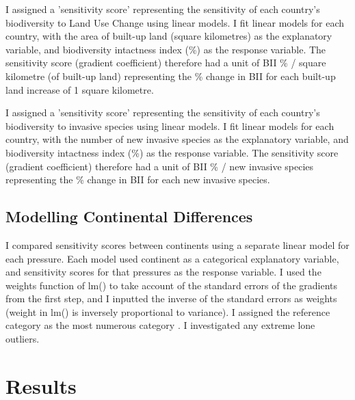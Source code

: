 \documentclass[11pt, a4paper, titlepage]{article}
\begin{document}
	I assigned a 'sensitivity score' representing the sensitivity of each country's biodiversity to Land Use Change using linear models. I fit linear models for each country, with the area of built-up land (square kilometres) as the explanatory variable, and biodiversity intactness index (\%) as the response variable. The sensitivity score (gradient coefficient) therefore had a unit of BII \% / square kilometre (of built-up land) representing the \% change in BII for each built-up land increase of 1 square kilometre.
	
	I assigned a 'sensitivity score' representing the sensitivity of each country's biodiversity to invasive species using linear models. I fit linear models for each country, with the number of new invasive species as the explanatory variable, and biodiversity intactness index (\%) as the response variable. The sensitivity score (gradient coefficient) therefore had a unit of BII \% / new invasive species representing the \% change in BII for each new invasive species. 

	\subsection*{Modelling Continental Differences}
	
	I compared sensitivity scores between continents using a separate linear model for each pressure. Each model used continent as a categorical explanatory variable, and sensitivity scores for that pressures as the response variable. I used the weights function of lm() to take account of the standard errors of the gradients from the first step, and I inputted the inverse of the standard errors as weights (weight in lm() is inversely proportional to variance). I assigned the reference category as the most numerous category \citep{peng2014discrepancy}. I investigated any extreme lone outliers.
	
	\clearpage

	\section*{Results}
	 
\end{document}
